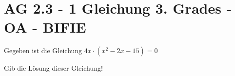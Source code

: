 \section{AG 2.3 - 1 Gleichung 3. Grades - OA - BIFIE}

\begin{beispiel}[AG 2.3]{1} %
Gegeben ist die Gleichung $4x\cdot (x^2-2x-15)=0$

Gib die Lösung dieser Gleichung!

\end{beispiel}